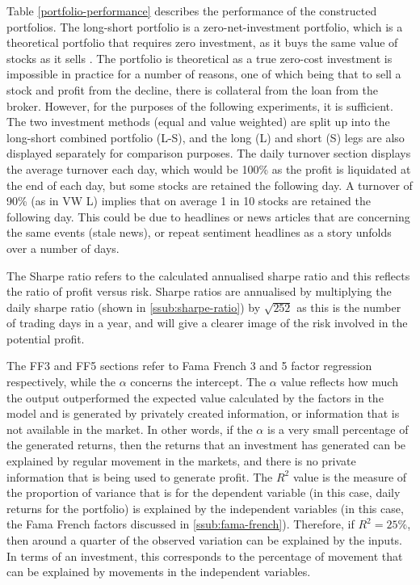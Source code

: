 Table \ref{portfolio-performance} describes the performance of the constructed portfolios. The long-short portfolio is a zero-net-investment portfolio, which is a theoretical portfolio that requires zero investment, as it buys the same value of stocks as it sells \parencite{zero-net}. The portfolio is theoretical as a true zero-cost investment is impossible in practice for a number of reasons, one of which being that to sell a stock and profit from the decline, there is collateral from the loan from the broker. However, for the purposes of the following experiments, it is sufficient. The two investment methods (equal and value weighted) are split up into the long-short combined portfolio (L-S), and the long (L) and short (S) legs are also displayed separately for comparison purposes. The daily turnover section displays the average turnover each day, which would be 100\% as the profit is liquidated at the end of each day, but some stocks are retained the following day. A turnover of 90\% (as in VW L) implies that on average 1 in 10 stocks are retained the following day. This could be due to headlines or news articles that are concerning the same events (stale news), or repeat sentiment headlines as a story unfolds over a number of days.

The Sharpe ratio refers to the calculated annualised sharpe ratio and this reflects the ratio of profit versus risk. Sharpe ratios are annualised by multiplying the daily sharpe ratio (shown in \ref{ssub:sharpe-ratio}) by $\sqrt{252}$ as this is the number of trading days in a year, and will give a clearer image of the risk involved in the potential profit.

The FF3 and FF5 sections refer to Fama French 3 and 5 factor regression respectively, while the $\alpha$ concerns the intercept. The $\alpha$ value reflects how much the output outperformed the expected value calculated by the factors in the model and is generated by privately created information, or information that is not available in the market. In other words, if the $\alpha$ is a very small percentage of the generated returns, then the returns that an investment has generated can be explained by regular movement in the markets, and there is no private information that is being used to generate profit. The $R^2$ value is the measure of the proportion of variance that is for the dependent variable (in this case, daily returns for the portfolio) is explained by the independent variables (in this case, the Fama French factors discussed in \ref{ssub:fama-french}). Therefore, if $R^2 = 25\%$, then around a quarter of the observed variation can be explained by the inputs. In terms of an investment, this corresponds to the percentage of movement that can be explained by movements in the independent variables.


